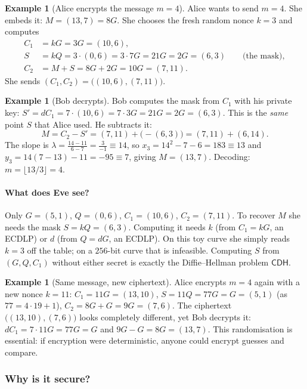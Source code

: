 \documentclass[11pt,a4paper,oneside]{book}
\theoremstyle{plain}
\theoremstyle{definition}
\newtheorem{example}[theorem]{Example}
\theoremstyle{remark}
\newcommand{\CDH}{\mathsf{CDH}}
\begin{document}
\begin{example}[Alice encrypts the message $m=4$]\label{ex:EGenc}
Alice wants to send $m=4$. She embeds it: $M=(13,7)=8G$. She chooses the fresh random nonce $k=3$ and computes
\begin{align*}
C_1&=kG=3G=(10,6),\\
S&=kQ=3\cdot(0,6)=3\cdot7G=21G=2G=(6,3)\qquad\text{(the mask)},\\
C_2&=M+S=8G+2G=10G=(7,11).
\end{align*}
She sends $(C_1,C_2)=\big((10,6),(7,11)\big)$.
\end{example}

\begin{example}[Bob decrypts]\label{ex:EGdec}
Bob computes the mask from $C_1$ with his private key:
$S'=dC_1=7\cdot(10,6)=7\cdot3G=21G=2G=(6,3)$. This is the \emph{same} point $S$ that Alice used. He subtracts it:
\[
M=C_2-S'=(7,11)+\big(-(6,3)\big)=(7,11)+(6,14).
\]
The slope is $\lambda=\frac{14-11}{6-7}=\frac{3}{-1}\equiv14$, so $x_3=14^2-7-6=183\equiv13$ and $y_3=14(7-13)-11=-95\equiv7$, giving $M=(13,7)$. Decoding: $m=\lfloor13/3\rfloor=4$. \checkmark
\end{example}

\paragraph{What does Eve see?} Only $G=(5,1)$, $Q=(0,6)$, $C_1=(10,6)$, $C_2=(7,11)$. To recover $M$ she needs the mask $S=kQ=(6,3)$. Computing it needs $k$ (from $C_1=kG$, an ECDLP) or $d$ (from $Q=dG$, an ECDLP). On this toy curve she simply reads $k=3$ off the table; on a $256$-bit curve that is infeasible. Computing $S$ from $(G,Q,C_1)$ without either secret is exactly the Diffie--Hellman problem $\CDH$.

\begin{example}[Same message, new ciphertext]
Alice encrypts $m=4$ again with a new nonce $k=11$: $C_1=11G=(13,10)$, $S=11Q=77G=G=(5,1)$ (as $77=4\cdot19+1$), $C_2=8G+G=9G=(7,6)$. The ciphertext $\big((13,10),(7,6)\big)$ looks completely different, yet Bob decrypts it: $dC_1=7\cdot11G=77G=G$ and $9G-G=8G=(13,7)$. \checkmark
This randomisation is essential: if encryption were deterministic, anyone could encrypt guesses and compare.
\end{example}

\subsubsection*{Why is it secure?}
\end{document}
